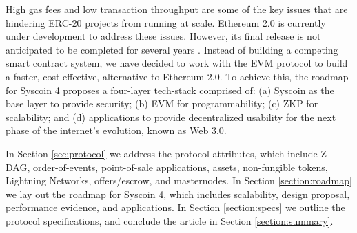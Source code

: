 \documentclass[peerreview]{ieeesyscoin}
\begin{document}
High gas fees and low transaction throughput are some of the key issues that are hindering ERC-20 projects from running at scale. Ethereum 2.0 is currently under development to address these issues. However, its final release is not anticipated to be completed for several years \cite{But19}. Instead of building a competing smart contract system, we have decided to work with the EVM protocol to build a faster, cost effective, alternative to Ethereum 2.0. To achieve this, the roadmap for Syscoin 4 proposes a four-layer tech-stack \cite{Sig21} comprised of: (a) Syscoin as the base layer to provide security; (b) EVM for programmability; (c) ZKP for scalability; and (d) applications to provide decentralized usability for the next phase of the internet's evolution, known as Web 3.0. 

In Section \ref{sec:protocol} we address the protocol attributes, which include Z-DAG, order-of-events, point-of-sale applications, assets, non-fungible tokens, Lightning Networks, offers/escrow, and masternodes. In Section \ref{section:roadmap} we lay out the roadmap for Syscoin 4, which includes scalability, design proposal, performance evidence, and applications. In Section \ref{section:specs} we outline the protocol specifications, and conclude the article in Section \ref{section:summary}.
\end{document}
